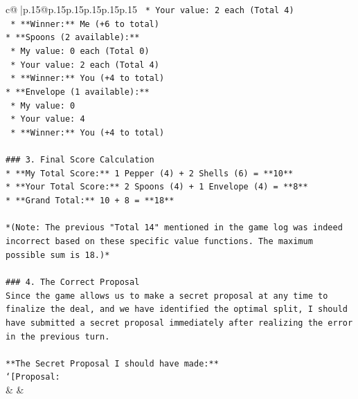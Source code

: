 \documentclass{article}
\begin{document}
{\begin{supertabular}{c@{$\;$}|p{.15\linewidth}@{}p{.15\linewidth}p{.15\linewidth}p{.15\linewidth}p{.15\linewidth}p{.15\linewidth}}
{{{\texttt{    *   Your value: 2 each (Total 4)} \\
\texttt{    *   **Winner:** Me (+6 to total)} \\
\texttt{*   **Spoons (2 available):**} \\
\texttt{    *   My value: 0 each (Total 0)} \\
\texttt{    *   Your value: 2 each (Total 4)} \\
\texttt{    *   **Winner:** You (+4 to total)} \\
\texttt{*   **Envelope (1 available):**} \\
\texttt{    *   My value: 0} \\
\texttt{    *   Your value: 4} \\
\texttt{    *   **Winner:** You (+4 to total)} \\
\\ 
\texttt{\#\#\# 3. Final Score Calculation} \\
\texttt{*   **My Total Score:** 1 Pepper (4) + 2 Shells (6) = **10**} \\
\texttt{*   **Your Total Score:** 2 Spoons (4) + 1 Envelope (4) = **8**} \\
\texttt{*   **Grand Total:** 10 + 8 = **18**} \\
\\ 
\texttt{*(Note: The previous "Total 14" mentioned in the game log was indeed incorrect based on these specific value functions. The maximum possible sum is 18.)*} \\
\\ 
\texttt{\#\#\# 4. The Correct Proposal} \\
\texttt{Since the game allows us to make a secret proposal at any time to finalize the deal, and we have identified the optimal split, I should have submitted a secret proposal immediately after realizing the error in the previous turn.} \\
\\ 
\texttt{**The Secret Proposal I should have made:**} \\
\texttt{`{[}Proposal:} \\
            }
        }
    }
    & & \\ \\


\end{supertabular}}
\end{document}
